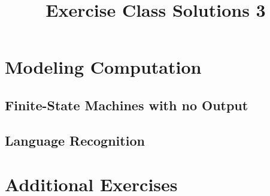 \documentclass[11pt,a4paper]{article}
\newcommand{\chapter}[2]{%
\setcounter{section}{#1-1}%
\section{#2}%
}
\newcommand{\subchapter}[2]{%
\setcounter{subsection}{#1-1}%
\subsection{#2}%
}
\begin{document}
\title{Exercise Class Solutions 3}
\date{}
\author{}
\maketitle

\chapter{13}{Modeling Computation}
	\subchapter{3}{Finite-State Machines with no Output}
		
		\pagebreak
	\subchapter{4}{Language Recognition}
		
		\pagebreak
		
		\pagebreak
		
		\pagebreak
		
		\pagebreak
		
		\pagebreak

\section*{Additional Exercises}
	\subsection*{}
		
		
\end{document}
